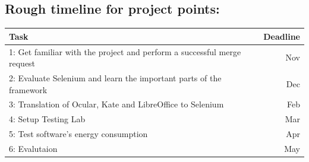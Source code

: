\documentclass{article}
\begin{document}


    \newpage

    \begin{center}
    \section*{Rough timeline for project points:}
    \begin{tabular}{ | l | r | }
    \hline
    Task & Deadline \\
    \hline\hline
    1: Get familiar with the project and perform a successful merge request   & Nov \\
    \hline
    2: Evaluate Selenium and learn the important parts of the framework & Dec\\
    \hline
    3: Translation of Ocular, Kate and LibreOffice to Selenium & Feb\\
    \hline
    4: Setup Testing Lab & Mar\\
    \hline
    5: Test software's energy consumption & Apr\\
    \hline
    6: Evalutaion & May\\
    \hline
    \end{tabular}
    \end{center}
\end{document}
